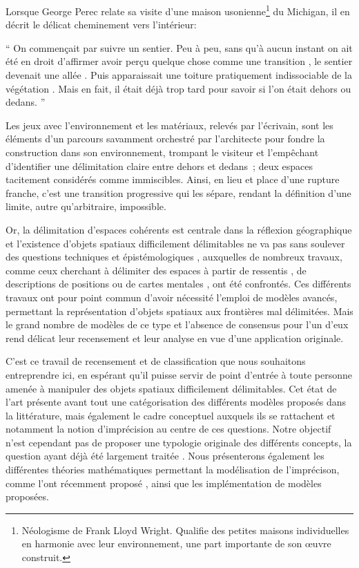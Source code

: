 Lorsque George Perec relate sa visite d’une maison usonienne\footnote{
  Néologisme de Frank Lloyd Wright. Qualifie des petites maisons
  individuelles en harmonie avec leur environnement, une part
  importante de son œuvre construit.} du Michigan, il en décrit le
délicat cheminement vers l’intérieur:

\begin{displayquote}[Perec, 1974, pp. 52-53]
  \enquote{%
    On commençait par suivre un sentier\textelp{}. Peu à peu,
    \textelp{} sans qu’à aucun instant on ait été en droit d’affirmer
    avoir perçu quelque chose comme une transition \textelp{}, le
    sentier devenait \textelp{} une allée \textelp{}. Puis
    apparaissait \textelp{} une toiture \textelp{} pratiquement
    indissociable de la végétation \textelp{}. Mais en fait, il était
    déjà trop tard pour savoir si l’on était dehors ou dedans.%
  }
\end{displayquote}

Les jeux avec l’environnement et les matériaux, relevés par
l’écrivain, sont les éléments d’un parcours savamment orchestré par
l’architecte pour fondre la construction dans son environnement,
trompant le visiteur et l’empêchant d’identifier une délimitation
claire entre dehors et dedans ; deux espaces tacitement considérés
comme immiscibles. Ainsi, en lieu et place d’une rupture franche,
c’est une transition progressive qui les sépare, rendant la définition
d’une limite, autre qu’arbitraire, impossible.

Or, la délimitation d’espaces cohérents est centrale dans la réflexion
géographique et l’existence d’objets spatiaux difficilement
délimitables ne va pas sans soulever des questions techniques et
épistémologiques \autocite{Burrough1996b}, auxquelles de nombreux
travaux, comme ceux cherchant à délimiter des espaces à partir de
ressentis \autocite{Arabacioglu2010}, de descriptions de positions
\autocite{Jones2007, Wolter2018,Bunel2019} ou de cartes mentales
\autocite{Dutozia2014}, ont été confrontés. Ces différents travaux ont
pour point commun d’avoir nécessité l’emploi de modèles avancés,
permettant la représentation d’objets spatiaux aux frontières mal
délimitées. Mais le grand nombre de modèles de ce type et l’absence de
consensus pour l’un d’eux rend délicat leur recensement et leur
analyse en vue d’une application originale.

C’est ce travail de recensement et de classification que nous
souhaitons entreprendre ici, en espérant qu’il puisse servir de point
d’entrée à toute personne amenée à manipuler des objets spatiaux
difficilement délimitables.  Cet état de l’art présente avant tout une
catégorisation des différents modèles proposés dans la littérature,
mais également le cadre conceptuel auxquels ils se rattachent et
notamment la notion d’imprécision au centre de ces questions. Notre
objectif n’est cependant pas de proposer une typologie originale des
différents concepts, la question ayant déjà été largement traitée
\autocite{Bouchon-Meunier1995,Fisher2006,Devilliers2019}. Nous
présenterons également les différentes théories mathématiques
permettant la modélisation de l’imprécison, comme l’ont récemment
proposé \autocite{Batton-Hubert2019}, ainsi que les implémentation de
modèles proposées.

